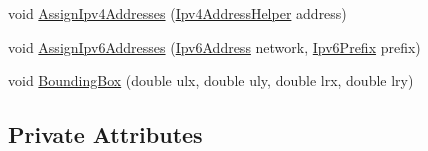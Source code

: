 \begin{DoxyCompactItemize}
\item 
void \hyperlink{classns3_1_1PointToPointStarHelper_ac92083654a8ef52b71f94397e0c0645d}{Assign\+Ipv4\+Addresses} (\hyperlink{classns3_1_1Ipv4AddressHelper}{Ipv4\+Address\+Helper} address)
\item 
void \hyperlink{classns3_1_1PointToPointStarHelper_a9a3381195fbbba9e1e5f1e3213270e48}{Assign\+Ipv6\+Addresses} (\hyperlink{classns3_1_1Ipv6Address}{Ipv6\+Address} network, \hyperlink{classns3_1_1Ipv6Prefix}{Ipv6\+Prefix} prefix)
\item 
void \hyperlink{classns3_1_1PointToPointStarHelper_ac7a841f46083a95cd087374bce5fe7c2}{Bounding\+Box} (double ulx, double uly, double lrx, double lry)
\end{DoxyCompactItemize}
\subsection*{Private Attributes}
